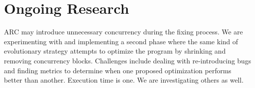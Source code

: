 \section{Ongoing Research}
\label{sec:ongoing}

ARC may introduce unnecessary concurrency during the fixing process. We are
experimenting with and implementing a second phase where the same kind of
evolutionary strategy attempts to optimize the program by shrinking and
removing concurrency blocks.  Challenges include dealing with re-introducing
bugs and finding metrics to determine when one proposed optimization performs
better than another.  Execution time is one.  We are investigating others as
well.

